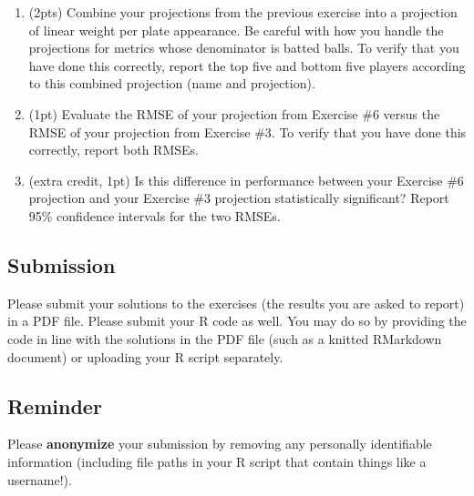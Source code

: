 \documentclass{article}
\begin{document}
\begin{enumerate}
      \item (2pts) Combine your projections from the previous exercise into a projection of linear weight per plate appearance. Be careful with how you handle the projections for metrics whose denominator is batted balls. To verify that you have done this correctly, report the top five and bottom five players according to this combined projection (name and projection).
      \item (1pt) Evaluate the RMSE of your projection from Exercise \#6 versus the RMSE of your projection from Exercise \#3. To verify that you have done this correctly, report both RMSEs.
      \item (extra credit, 1pt) Is this difference in performance between your Exercise \#6 projection and your Exercise \#3 projection statistically significant? Report 95\% confidence intervals for the two RMSEs.
    \end{enumerate}

    \subsection*{\sc Submission}

      Please submit your solutions to the exercises (the results you are asked to report) in a PDF file. Please submit your R code as well. You may do so by providing the code in line with the solutions in the PDF file (such as a knitted RMarkdown document) or uploading your R script separately.

    \subsection*{\sc Reminder}

      Please {\bf anonymize} your submission by removing any personally identifiable information (including file paths in your R script that contain things like a username!).
\end{document}
